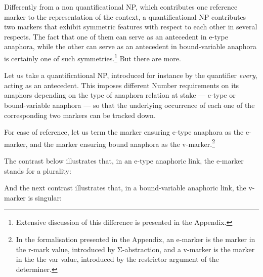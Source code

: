 \documentclass[output=paper
,modfonts
,nonflat]{langsci/langscibook}
\begin{document}

Differently from a non quantificational NP, which contributes
one reference marker to the representation of the context, a quantificational
NP contributes two markers that exhibit symmetric features
with respect to each other in several respects. 
The fact that
one of them can serve as an antecedent in e-type anaphora, while
the other can serve as an antecedent in bound-variable anaphora is certainly
one of such symmetries.\footnote
{Extensive discussion  of this difference is presented in the Appendix.}
 But there are more.

Let us take a quantificational NP, introduced for instance by the quantifier {\em every}, 
acting as an antecedent. This imposes
different Number requirements on its anaphors depending on the
type of anaphora relation at stake --- e-type or bound-variable anaphora --- so that the
underlying occurrence of each one of the corresponding
two markers can be tracked down.


For ease of reference, let us term the marker ensuring e-type anaphora as the e-marker, 
and the marker ensuring bound anaphora as the v-marker.\footnote{
In the formalisation presented in the Appendix, an e-marker is the marker in the {\sc r-mark} value, 
introduced by \mbox{Σ-abstraction}, 
and a v-marker is the marker in the the {\sc var} value,
introduced by the restrictor argument of the determiner.}

The contrast below illustrates that, in an e-type anaphoric link, the e-marker stands for a plurality:

\begin{exe}
\end{exe}

And the next contrast illustrates that, in a bound-variable anaphoric link, the v-marker is singular:

\begin{exe}
\end{exe}
\end{document}
